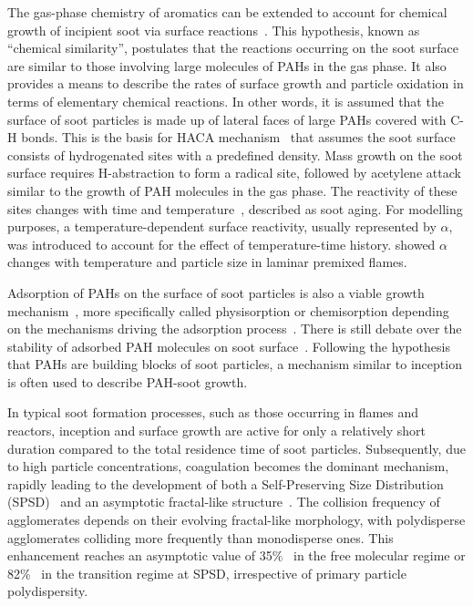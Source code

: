The gas-phase chemistry of aromatics can be extended to account for chemical growth of incipient soot via surface reactions~\citep{frenklach2002reaction}. This hypothesis, known as “chemical similarity”, postulates that the reactions occurring on the soot surface are similar to those involving large molecules of PAHs in the gas phase. It also provides a means to describe the rates of surface growth and particle oxidation in
terms of elementary chemical reactions. In other words, it is assumed that the surface of soot particles is made up of lateral faces of large PAHs covered with C-H bonds.
This is the basis for HACA mechanism~\citep{frenklach1991detailed, appel2000kinetic}  that assumes the soot surface consists of hydrogenated sites with a predefined density. Mass growth on the soot surface requires H-abstraction to form a radical
site, followed by acetylene attack similar to the growth of PAH molecules in the gas phase. The reactivity of these sites changes with time and temperature~\citep{woods1991soot, dasch1985decay}, described as soot aging. For modelling purposes, a temperature-dependent surface reactivity, usually represented by $\alpha$, was introduced to account for the effect of temperature-time history. \citet{appel2000kinetic} showed $\alpha$ changes with temperature and particle size in laminar premixed flames.


Adsorption of PAHs on the surface of soot particles is also a viable growth mechanism~\citep{frenklach1991detailed}, more specifically called physisorption or chemisorption depending on the mechanisms driving the adsorption process~\citep{michelsen2020review}. There is still debate over the stability of adsorbed PAH molecules on soot surface~\citep{obolensky2007interplay}. Following the hypothesis that PAHs are building blocks of soot particles, a mechanism similar to inception is often used to describe  PAH-soot growth.


In typical soot formation processes, such as those occurring in flames and reactors, inception and surface growth are active for only a relatively short duration compared to the total residence time of soot particles. Subsequently, due to high particle concentrations, coagulation becomes the dominant mechanism, rapidly leading to the development of both a Self-Preserving Size Distribution (SPSD)~\citep{lai1972self} and an asymptotic fractal-like structure~\citep{mountain1986simulation, Goudeli2016}.
The collision frequency of agglomerates depends on their evolving fractal-like morphology, with polydisperse agglomerates colliding more frequently than monodisperse ones. This enhancement reaches an asymptotic value of 35$\%$~\citep{Goudeli2016} in the free molecular regime or 82$\%$~\citep{kelesidis2021self} in the transition regime at SPSD, irrespective of primary particle polydispersity.

